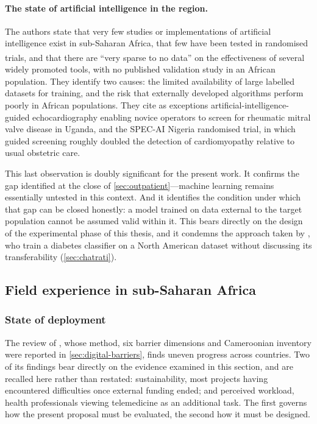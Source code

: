 \documentclass[12pt,a4paper,oneside]{report}
\newcommand{\bq}[1]{``#1''\textsuperscript{\dag}}
\begin{document}
\paragraph{The state of artificial intelligence in the region.} The authors state that very few studies or implementations of artificial intelligence exist in sub-Saharan Africa, that few have been tested in randomised trials, and that there are \bq{very sparse to no data} on the effectiveness of several widely promoted tools, with no published validation study in an African population. They identify two causes: the limited availability of large labelled datasets for training, and the risk that externally developed algorithms perform poorly in African populations. They cite as exceptions artificial-intelligence-guided echocardiography enabling novice operators to screen for rheumatic mitral valve disease in Uganda, and the SPEC-AI Nigeria randomised trial, in which guided screening roughly doubled the detection of cardiomyopathy relative to usual obstetric care.

This last observation is doubly significant for the present work. It confirms the gap identified at the close of \cref{sec:outpatient}---machine learning remains essentially untested in this context. And it identifies the condition under which that gap can be closed honestly: a model trained on data external to the target population cannot be assumed valid within it. This bears directly on the design of the experimental phase of this thesis, and it condemns the approach taken by \textcite{chatrati2022}, who train a diabetes classifier on a North American dataset without discussing its transferability (\cref{sec:chatrati}).

\subsection{Field experience in sub-Saharan Africa}\label{sec:field-ssa}

\subsubsection{State of deployment}

The review of \textcite{dodoo2022}, whose method, six barrier dimensions and Cameroonian inventory were reported in \cref{sec:digital-barriers}, finds uneven progress across countries. Two of its findings bear directly on the evidence examined in this section, and are recalled here rather than restated: sustainability, most projects having encountered difficulties once external funding ended; and perceived workload, health professionals viewing telemedicine as an additional task. The first governs how the present proposal must be evaluated, the second how it must be designed.
\end{document}
